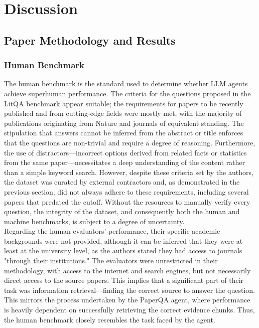 \section{Discussion}
\label{sec:discussion}
\subsection{Paper Methodology and Results}

\subsubsection{Human Benchmark}
The human benchmark is the standard used to determine whether LLM agents achieve superhuman performance. The criteria for the questions proposed in the LitQA benchmark appear suitable; the requirements for papers to be recently published and from cutting-edge fields were mostly met, with the majority of publications originating from Nature and journals of equivalent standing. The stipulation that answers cannot be inferred from the abstract or title enforces that the questions are non-trivial and require a degree of reasoning. Furthermore, the use of distractors—incorrect options derived from related facts or statistics from the same paper—necessitates a deep understanding of the content rather than a simple keyword search. However, despite these criteria set by the authors, the dataset was curated by external contractors and, as demonstrated in the previous section, did not always adhere to these requirements, including several papers that predated the cutoff. Without the resources to manually verify every question, the integrity of the dataset, and consequently both the human and machine benchmarks, is subject to a degree of uncertainty. \\

Regarding the human evaluators' performance, their specific academic backgrounds were not provided, although it can be inferred that they were at least at the university level, as the authors stated they had access to journals "through their institutions." The evaluators were unrestricted in their methodology, with access to the internet and search engines, but not necessarily direct access to the source papers. This implies that a significant part of their task was information retrieval—finding the correct source to answer the question. This mirrors the process undertaken by the PaperQA agent, where performance is heavily dependent on successfully retrieving the correct evidence chunks. Thus, the human benchmark closely resembles the task faced by the agent. \\

